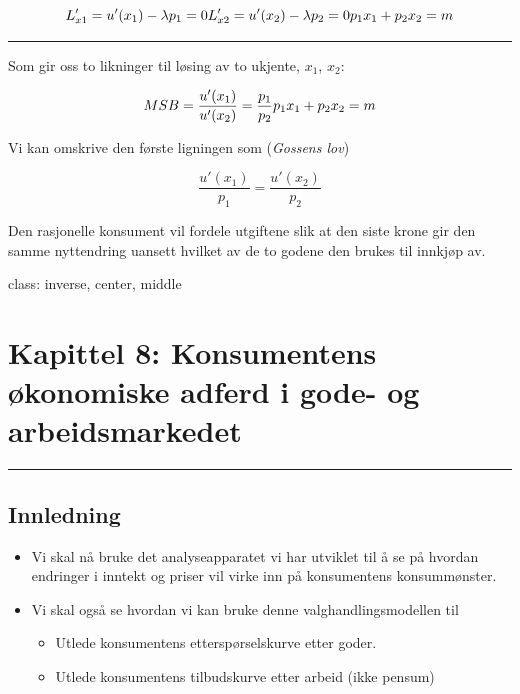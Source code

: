 \documentclass[
  letterpaper,
  DIV=11,
  numbers=noendperiod]{scrartcl}
\providecommand{\tightlist}{%
  \setlength{\itemsep}{0pt}\setlength{\parskip}{0pt}}\usepackage{longtable,booktabs,array}
\begin{document}
\begin{equation*}
L'_{x1}=u'({x_{1}}) - \lambda p_{1} = 0 \\
L'_{x2}=u'({x_{2}}) - \lambda p_{2} = 0 \\
p_{1}x_{1}+p_{2}x_{2}=m
\end{equation*}

\begin{center}\rule{0.5\linewidth}{0.5pt}\end{center}

Som gir oss to likninger til løsing av to ukjente, \(x_{1}\), \(x_{2}\):

\begin{equation*}
MSB=\frac{u'({x_{1}})}{u'({x_{2}})} = \frac{p_{1}}{p_{2}}  \\
p_{1}x_{1}+p_{2}x_{2}=m
\end{equation*}

Vi kan omskrive den første ligningen som (\emph{Gossens lov})

\begin{equation*}
\frac{u'({x_{1}})}{p_{1}}= \frac{u'({x_{2}})}{p_{2}}
\end{equation*}

Den rasjonelle konsument vil fordele utgiftene slik at den siste krone
gir den samme nyttendring uansett hvilket av de to godene den brukes til
innkjøp av.

class: inverse, center, middle

\section{Kapittel 8: Konsumentens økonomiske adferd i gode- og
arbeidsmarkedet}\label{kapittel-8-konsumentens-uxf8konomiske-adferd-i-gode--og-arbeidsmarkedet}

\begin{center}\rule{0.5\linewidth}{0.5pt}\end{center}

\subsection{Innledning}\label{innledning-2}

\begin{itemize}
\tightlist
\item
  Vi skal nå bruke det analyseapparatet vi har utviklet til å se på
  hvordan endringer i inntekt og priser vil virke inn på konsumentens
  konsummønster.
\item
  Vi skal også se hvordan vi kan bruke denne valghandlingsmodellen til

  \begin{itemize}
  \tightlist
  \item
    Utlede konsumentens etterspørselskurve etter goder.\\
  \item
    Utlede konsumentens tilbudskurve etter arbeid (ikke pensum)
  \end{itemize}
\end{itemize}
\end{document}
